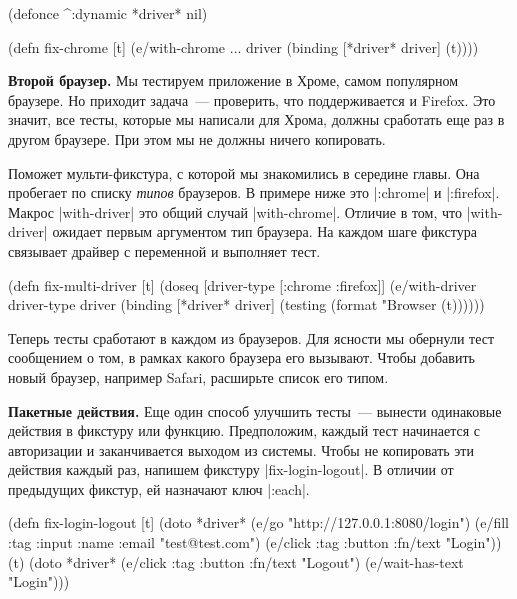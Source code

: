 \begin{english}
  \begin{clojure}
(defonce ^:dynamic *driver* nil)

(defn fix-chrome [t]
  (e/with-chrome {...} driver
    (binding [*driver* driver]
      (t))))
  \end{clojure}
\end{english}

\textbf{Второй браузер.} Мы тестируем приложение в Хроме, самом популярном
браузере. Но приходит задача~--- проверить, что поддерживается и Firefox. Это
значит, все тесты, которые мы написали для Хрома, должны сработать еще раз в
другом браузере. При этом мы не должны ничего копировать.

Поможет мульти-фикстура, с которой мы знакомились в середине главы. Она
пробегает по списку \emph{типов} браузеров. В примере ниже это \spverb|:chrome|
и \spverb|:firefox|. Макрос \spverb|with-driver| это общий случай
\spverb|with-chrome|. Отличие в том, что \spverb|with-driver| ожидает первым
аргументом тип браузера. На каждом шаге фикстура связывает драйвер с переменной
и выполняет тест.

\begin{english}
  \begin{clojure}
(defn fix-multi-driver [t]
  (doseq [driver-type [:chrome :firefox]]
    (e/with-driver driver-type {} driver
      (binding [*driver* driver]
        (testing (format "Browser %
          (t))))))
  \end{clojure}
\end{english}

Теперь тесты сработают в каждом из браузеров. Для ясности мы обернули тест
сообщением о том, в рамках какого браузера его вызывают. Чтобы добавить новый
браузер, например Safari, расширьте список его типом.

\textbf{Пакетные действия.} Еще один способ улучшить тесты~--- вынести
одинаковые действия в фикстуру или функцию. Предположим, каждый тест начинается
с авторизации и заканчивается выходом из системы. Чтобы не копировать эти
действия каждый раз, напишем фикстуру \spverb|fix-login-logout|. В отличии от
предыдущих фикстур, ей назначают ключ \spverb|:each|.

\begin{english}
  \begin{clojure}
(defn fix-login-logout [t]
  (doto *driver*
    (e/go "http://127.0.0.1:8080/login")
    (e/fill {:tag :input :name :email} "test@test.com")
    (e/click {:tag :button :fn/text "Login"}))
  (t)
  (doto *driver*
    (e/click {:tag :button :fn/text "Logout"})
    (e/wait-has-text "Login")))
  \end{clojure}
\end{english}


